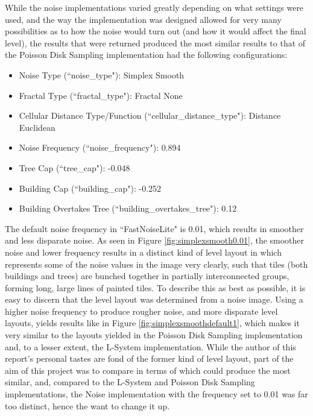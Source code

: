 While the noise implementations varied greatly depending on what settings were used, and the way the implementation was designed allowed for very many possibilities as to how the noise would turn out (and how it would affect the final level), the results that were returned produced the most similar results to that of the Poisson Disk Sampling implementation had the following configurations:

\begin{itemize} \label{noisedefaults}
    \item Noise Type (``noise\_type"): Simplex Smooth
    \item Fractal Type (``fractal\_type"): Fractal None
    \item Cellular Distance Type/Function (``cellular\_distance\_type"): Distance Euclidean
    \item Noise Frequency (``noise\_frequency"): 0.894
    \item Tree Cap (``tree\_cap"): -0.048
    \item Building Cap (``building\_cap"): -0.252
    \item Building Overtakes Tree (``building\_overtakes\_tree"): 0.12
\end{itemize}

The default noise frequency in ``FastNoiseLite" is 0.01, which results in smoother and less disparate noise. As seen in Figure \ref{fig:simplexsmooth0.01}, the smoother noise and lower frequency results in a distinct kind of level layout in which represents some of the noise values in the image very clearly, such that tiles (both buildings and trees) are bunched together in partially interconnected groups, forming long, large lines of painted tiles. To describe this as best as possible, it is easy to discern that the level layout was determined from a noise image. Using a higher noise frequency to produce rougher noise, and more disparate level layouts, yields results like in Figure \ref{fig:simplexsmoothdefault1}, which makes it very similar to the layouts yielded in the Poisson Disk Sampling implementation and, to a lesser extent, the L-System implementation. While the author of this report's personal tastes are fond of the former kind of level layout, part of the aim of this project was to compare in terms of which could produce the most similar, and, compared to the L-System and Poisson Disk Sampling implementations, the Noise implementation with the frequency set to 0.01 was far too distinct, hence the want to change it up.

